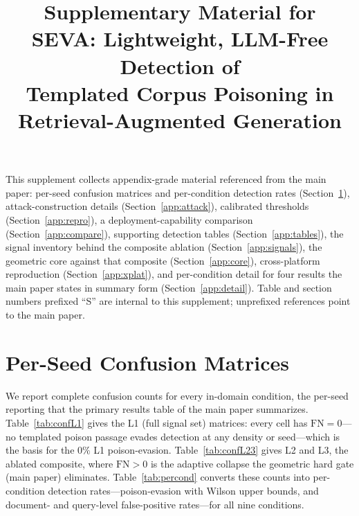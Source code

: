 \documentclass[lettersize,journal]{IEEEtran}
\begin{document}
\title{Supplementary Material for\\
SEVA: Lightweight, LLM-Free Detection of\\
Templated Corpus Poisoning in\\
Retrieval-Augmented Generation}

\author{
}

\maketitle

\noindent This supplement collects appendix-grade material referenced from the main
paper: per-seed confusion matrices and per-condition detection rates
(Section~\ref{app:confusion}), attack-construction details (Section~\ref{app:attack}),
calibrated thresholds (Section~\ref{app:repro}), a deployment-capability comparison
(Section~\ref{app:compare}), supporting detection tables (Section~\ref{app:tables}), the
signal inventory behind the composite ablation (Section~\ref{app:signals}),
the geometric core against that composite (Section~\ref{app:core}),
cross-platform reproduction (Section~\ref{app:xplat}), and per-condition
detail for four results the main paper states in summary form
(Section~\ref{app:detail}). Table
and section numbers prefixed ``S'' are internal to this supplement; unprefixed references
point to the main paper.

\section{Per-Seed Confusion Matrices}
\label{app:confusion}
We report complete confusion counts for every in-domain condition, the per-seed
reporting that the primary results table of the main paper summarizes. Table~\ref{tab:confL1}
gives the L1 (full signal set) matrices: every cell has $\mathrm{FN}=0$---no
templated poison passage evades detection at any density or seed---which is the
basis for the $0\%$ L1 poison-evasion. Table~\ref{tab:confL23} gives L2 and L3, the
ablated composite, where $\mathrm{FN}>0$ is the adaptive collapse the geometric hard
gate (main paper) eliminates. Table~\ref{tab:percond} converts these
counts into per-condition detection rates---poison-evasion with Wilson upper bounds,
and document- and query-level false-positive rates---for all nine conditions.
\end{document}
